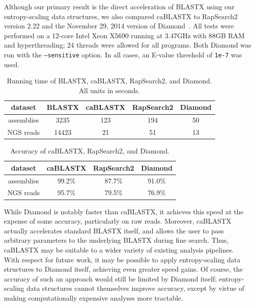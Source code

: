 \documentclass[review,preprint,12pt]{elsarticle}
\renewcommand{\cite}{\citep} %
\theoremstyle{definition}
\theoremstyle{remark}
\numberwithin{equation}{section}
\begin{document}
Although our primary result is the direct acceleration of BLASTX using our
entropy-scaling data structures, we also compared caBLASTX to 
RapSearch2~\cite{zhao2012rapsearch2} version 2.22 and the November 29, 2014 
version of Diamond~\cite{buchfink2014fast}.
All tests were performed on a 12-core Intel Xeon X5690 running at 3.47GHz with
88GB RAM and hyperthreading; 24 threads were allowed for all programs.
Both Diamond was run with the \texttt{--sensitive} option.
In all cases, an E-value threshold of \texttt{1e-7} was used.

\begin{table}
\caption{Running time of BLASTX, caBLASTX, RapSearch2, and Diamond. All units in seconds.\label{mgspeed}}
\begin{tabular}{ccccc}
\hline
dataset & BLASTX & caBLASTX & RapSearch2 & Diamond \\
\hline
assemblies & 3235 & 123 & 194 & 50 \\
\hline
NGS reads & 14423 & 21 & 51 & 13 \\
\hline
\end{tabular}
\end{table}

\begin{table}
\caption{Accuracy of caBLASTX, RapSearch2, and Diamond.\label{mgacc}}
\begin{tabular}{cccc}
\hline
dataset & caBLASTX & RapSearch2 & Diamond \\
\hline
assemblies & 99.2\% & 87.7\% & 91.0\% \\
\hline
NGS reads & 95.7\% & 79.5\% & 76.9\% \\
\hline
\end{tabular}
\end{table}

While Diamond is notably faster than caBLASTX, it achieves this speed at the
expense of some accuracy, particularly on raw reads.
Moreover, caBLASTX actually accelerates standard BLASTX itself, and allows the
user to pass arbitrary parameters to the underlying BLASTX during fine search.
Thus, caBLASTX may be suitable to a wider variety of existing analysis 
pipelines.
With respect for future work, it may be possible to apply entropy-scaling data
structures to Diamond itself, achieving even greater speed gains.
Of course, the accuracy of such an approach would still be limited by Diamond
itself; entropy-scaling data structures cannot themselves improve accuracy,
except by virtue of making computationally expensive analyses more tractable.
\end{document}
